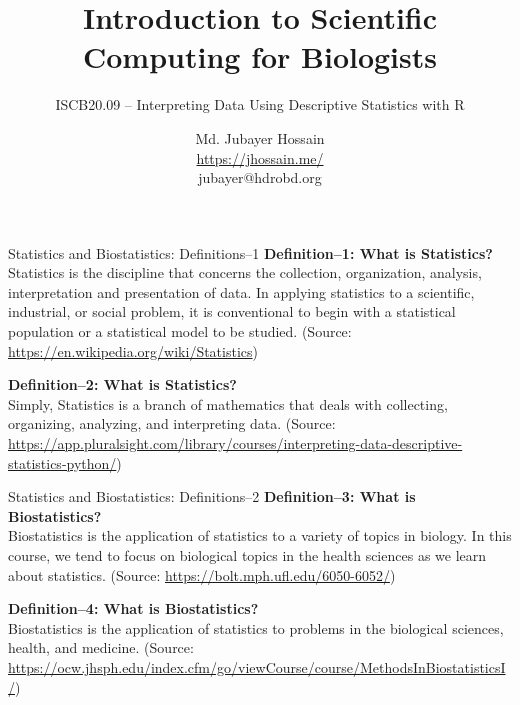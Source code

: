 \documentclass[10pt,dvipsnames, aspectratio=169]{beamer}
\author{Md. Jubayer Hossain \\ \url{https://jhossain.me/} \\ jubayer@hdrobd.org}
\title{Introduction to Scientific Computing for Biologists}
\institute{Founder \\ Health Data Research Organization \\ Lead Organizer \\ 
Scientific Computing for Biologists  }
\subtitle{ISCB20.09 -- Interpreting Data Using Descriptive Statistics with R}
\begin{document}
	\begin{frame}
		\maketitle
	\end{frame}

	\begin{frame}[t]{Statistics and Biostatistics: Definitions--1}
		\textbf{Definition--1: What is Statistics?} \\
		Statistics is the discipline that concerns the collection, 
		organization, 
		analysis, interpretation and presentation of data. In applying 
		statistics 
		to a scientific, industrial, or social problem, it is conventional to 
		begin 
		with a statistical population or a statistical model to be studied. 
		(Source: \url{https://en.wikipedia.org/wiki/Statistics})
		
		\textbf{Definition--2: What is Statistics?}\\ 
		Simply, Statistics is a branch of mathematics that deals with 
		collecting,
		organizing, analyzing, and interpreting data. 
		(Source: 
		\url{https://app.pluralsight.com/library/courses/interpreting-data-descriptive-statistics-python/})
	\end{frame}

	\begin{frame}[t]{Statistics and Biostatistics: Definitions--2}
		\textbf{Definition--3: What is Biostatistics?} \\
		Biostatistics is the application of statistics to a variety of topics 
		in 
		biology. In this course, we tend to focus on biological topics in the 
		health sciences as we learn about statistics. 
		(Source: \url{https://bolt.mph.ufl.edu/6050-6052/}) \\ 
		
		\vspace{6pt}
		
		\textbf{Definition--4: What is Biostatistics?} \\
		Biostatistics is the application of statistics to problems in the
		biological sciences, health, and medicine.
		(Source: 
		\url{https://ocw.jhsph.edu/index.cfm/go/viewCourse/course/MethodsInBiostatisticsI/})
		
	\end{frame}
\end{document}
